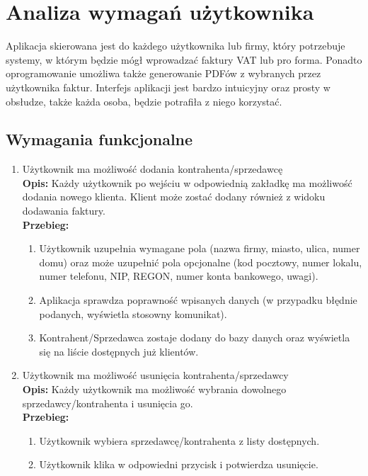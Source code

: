 \chapter{Analiza wymagań użytkownika}

Aplikacja skierowana jest do każdego użytkownika lub firmy, który potrzebuje systemy, w którym będzie mógł wprowadzać faktury VAT lub pro forma. Ponadto oprogramowanie umożliwa także generowanie PDFów z wybranych przez użytkownika faktur. Interfejs aplikacji jest bardzo intuicyjny oraz prosty w obsłudze, także każda osoba, będzie potrafiła z niego korzystać.

\section{Wymagania funkcjonalne}
\begin{enumerate}
    \item Użytkownik ma możliwość dodania kontrahenta/sprzedawcę \\
    \textbf{Opis: } Każdy użytkownik po wejściu w odpowiednią zakładkę ma możliwość dodania nowego klienta. Klient może zostać dodany również z widoku dodawania faktury.\\
    \textbf{Przebieg: }
    \begin{enumerate}
        \item Użytkownik uzupełnia wymagane pola (nazwa firmy, miasto, ulica, numer domu) oraz może uzupełnić pola opcjonalne (kod pocztowy, numer lokalu, numer telefonu, NIP, REGON, numer konta bankowego, uwagi).
        \item Aplikacja sprawdza poprawność wpisanych danych (w przypadku błędnie podanych, wyświetla stosowny komunikat).
        \item Kontrahent/Sprzedawca zostaje dodany do bazy danych oraz wyświetla się na liście dostępnych już klientów.\\
    \end{enumerate}
    
    \item Użytkownik ma możliwość usunięcia kontrahenta/sprzedawcy\\
    \textbf{Opis: } Każdy użytkownik ma możliwość wybrania dowolnego sprzedawcy/kontrahenta i usunięcia go.\\
    \textbf{Przebieg: } 
    \begin{enumerate}
        \item Użytkownik wybiera sprzedawcę/kontrahenta z listy dostępnych.
        \item Użytkownik klika w odpowiedni przycisk i potwierdza usunięcie.\\
    \end{enumerate}
    

\end{enumerate}
